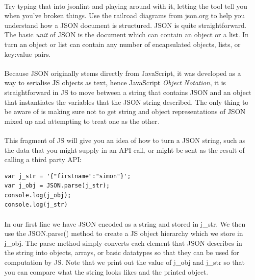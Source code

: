 \documentclass[10pt, a4paper, twosize]{article}
\begin{document}
\paragraph{} Try typing that into jsonlint and playing around with it, letting the tool tell you when you've broken things. Use the railroad diagrams from json.org to help you understand how a JSON document is structured. JSON is quite straightforward. The basic \emph{unit} of JSON is the document which can contain an object or a list. In turn an object or list can contain any number of encapsulated objects, lists, or key:value pairs.

\paragraph{} Because JSON originally stems directly from JavaScript, it was developed as a way to serialise JS objects as text, hence JavaScript \emph{Object Notation}, it is straightforward in JS to move between a string that contains JSON and an object that instantiates the variables that the JSON string described. The only thing to be aware of is making sure not to get string and object representations of JSON mixed up and attempting to treat one as the other.

\paragraph{} This fragment of JS will give you an idea of how to turn a JSON string, such as the data that you might supply in an API call, or might be sent as the result of calling a third party API:

\begin{lstlisting}
var j_str = '{"firstname":"simon"}';
var j_obj = JSON.parse(j_str);
console.log(j_obj);
console.log(j_str)
\end{lstlisting}

\paragraph{} In our first line we have JSON encoded as a string and stored in j\_str. We then use the JSON.parse() method to create a JS object hierarchy which we store in j\_obj. The parse method simply converts each element that JSON describes in the string into objects, arrays, or basic datatypes so that they can be used for computation by JS. Note that we print out the value of j\_obj and j\_str so that you can compare what the string looks likes and the printed object.
\end{document}
